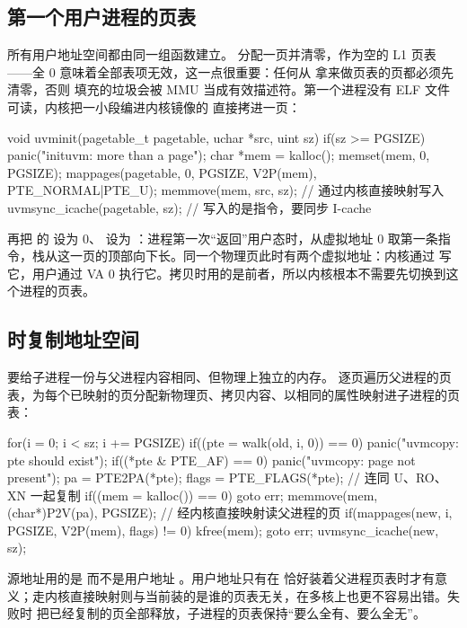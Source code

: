\subsection{第一个用户进程的页表}

所有用户地址空间都由同一组函数建立。 分配一页并清零，作为空的 L1 页表——全 0 意味着全部表项无效，这一点很重要：任何从  拿来做页表的页都必须先清零，否则  填充的垃圾会被 MMU 当成有效描述符。第一个进程没有 ELF 文件可读，内核把一小段编进内核镜像的  直接拷进一页：

\begin{ccode}
void uvminit(pagetable_t pagetable, uchar *src, uint sz) {
  if(sz >= PGSIZE) panic("inituvm: more than a page");
  char *mem = kalloc();
  memset(mem, 0, PGSIZE);
  mappages(pagetable, 0, PGSIZE, V2P(mem), PTE_NORMAL|PTE_U);
  memmove(mem, src, sz);              // 通过内核直接映射写入
  uvmsync_icache(pagetable, sz);      // 写入的是指令，要同步 I-cache
}
\end{ccode}

 再把  的  设为 0、 设为 ：进程第一次“返回”用户态时，从虚拟地址 0 取第一条指令，栈从这一页的顶部向下长。同一个物理页此时有两个虚拟地址：内核通过  写它，用户通过 VA 0 执行它。拷贝时用的是前者，所以内核根本不需要先切换到这个进程的页表。

\subsection{ 时复制地址空间}

 要给子进程一份与父进程内容相同、但物理上独立的内存。 逐页遍历父进程的页表，为每个已映射的页分配新物理页、拷贝内容、以相同的属性映射进子进程的页表：

\begin{ccode}
for(i = 0; i < sz; i += PGSIZE){
  if((pte = walk(old, i, 0)) == 0) panic("uvmcopy: pte should exist");
  if((*pte & PTE_AF) == 0)         panic("uvmcopy: page not present");
  pa = PTE2PA(*pte);
  flags = PTE_FLAGS(*pte);                     // 连同 U、RO、XN 一起复制
  if((mem = kalloc()) == 0) goto err;
  memmove(mem, (char*)P2V(pa), PGSIZE);        // 经内核直接映射读父进程的页
  if(mappages(new, i, PGSIZE, V2P(mem), flags) != 0){ kfree(mem); goto err; }
}
uvmsync_icache(new, sz);
\end{ccode}

源地址用的是  而不是用户地址 。用户地址只有在  恰好装着父进程页表时才有意义；走内核直接映射则与当前装的是谁的页表无关，在多核上也更不容易出错。失败时  把已经复制的页全部释放，子进程的页表保持“要么全有、要么全无”。

